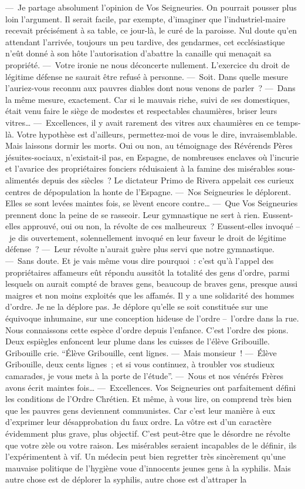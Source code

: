 \documentclass[french,twoside]{book} %
\begin{document}
— Je partage absolument l’opinion de Vos Seigneuries. On pourrait pousser plus loin l’argument. Il serait facile, par exempte, d’imaginer que l’industriel-maire recevait précisément à sa table, ce jour-là, le curé de la paroisse. Nul doute qu’en attendant l’arrivée, toujours un peu tardive, des gendarmes, cet ecclésiastique n’eût donné à son hôte l’autorisation d’abattre la canaille qui menaçait sa propriété. — Votre ironie ne nous déconcerte nullement. L’exercice du droit de légitime défense ne saurait être refusé à personne. — Soit. Dans quelle mesure l’auriez-vous reconnu aux pauvres diables dont nous venons de parler ? — Dans la même mesure, exactement. Car si le mauvais riche, suivi de ses domestiques, était venu faire le siège de modestes et respectables chaumières, briser leurs vitres… — Excellences, il y avait rarement des vitres aux chaumières en ce temps-là. Votre hypothèse est d’ailleurs, permettez-moi de vous le dire, invraisemblable. Mais laissons dormir les morts. Oui ou non, au témoignage des Révérends Pères jésuites-sociaux, n’existait-il pas, en Espagne, de nombreuses enclaves où l’incurie et l’avarice des propriétaires fonciers réduisaient à la famine des misérables sous-alimentés depuis des siècles ? Le dictateur Primo de Rivera appelait ces curieux centres de dépopulation la honte de l’Espagne. — Nos Seigneuries le déplorent. Elles se sont levées maintes fois, se lèvent encore contre… — Que Vos Seigneuries prennent donc la peine de se rasseoir. Leur gymnastique ne sert à rien. Eussent-elles approuvé, oui ou non, la révolte de ces malheureux ? Eussent-elles invoqué – je dis ouvertement, solennellement invoqué en leur faveur le droit de légitime défense ? — Leur révolte n’aurait guère plus servi que notre gymnastique. — Sans doute. Et je vais même vous dire pourquoi : c’est qu’à l’appel des propriétaires affameurs eût répondu aussitôt la totalité des gens d’ordre, parmi lesquels on aurait compté de braves gens, beaucoup de braves gens, presque aussi maigres et non moins exploités que les affamés. Il y a une solidarité des hommes d’ordre. Je ne la déplore pas. Je déplore qu’elle se soit constituée sur une équivoque inhumaine, sur une conception hideuse de l’ordre – l’ordre dans la rue. Nous connaissons cette espèce d’ordre depuis l’enfance. C’est l’ordre des pions. Deux espiègles enfoncent leur plume dans les cuisses de l’élève Gribouille. Gribouille crie. “Élève Gribouille, cent lignes. — Mais monsieur ! — Élève Gribouille, deux cents lignes ; et si vous continuez, à troubler vos studieux camarades, je vous mets à la porte de l’étude”. — Nous et nos vénérés Frères avons écrit maintes fois… — Excellences. Vos Seigneuries ont parfaitement défini les conditions de l’Ordre Chrétien. Et même, à vous lire, on comprend très bien que les pauvres gens deviennent communistes. Car c’est leur manière à eux d’exprimer leur désapprobation du faux ordre. La vôtre est d’un caractère évidemment plus grave, plus objectif. C’est peut-être que le désordre ne révolte que votre zèle ou votre raison. Les misérables seraient incapables de le définir, ils l’expérimentent à vif. Un médecin peut bien regretter très sincèrement qu’une mauvaise politique de l’hygiène voue d’innocents jeunes gens à la syphilis. Mais autre chose est de déplorer la syphilis, autre chose est d’attraper la 
\end{document}
